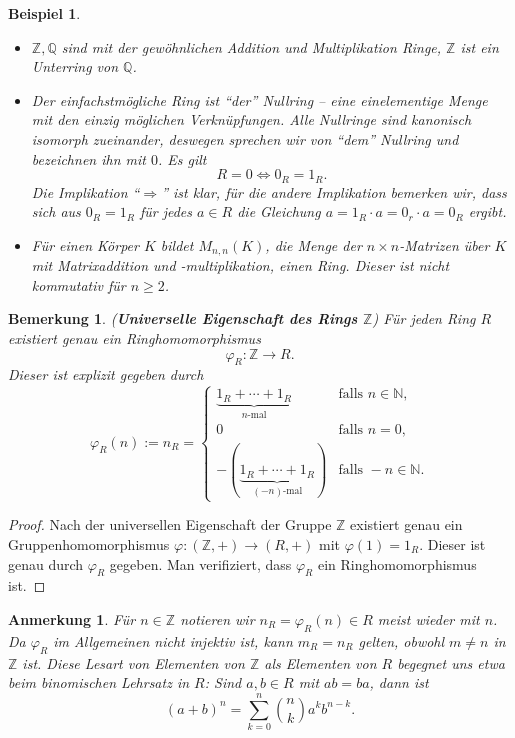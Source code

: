 \documentclass[a4paper, twoside, 11pt, ngerman]{report}
\newcommand{\NN}{\mathds N}
\newcommand{\QQ}{\mathds Q}
\newcommand{\ZZ}{\mathds Z}
\theoremstyle{definistyle}
\newtheorem{bem}[satz]{Bemerkung}
\newtheorem{anm}[satz]{Anmerkung}
\newtheorem{bsp}[satz]{Beispiel}
\theoremstyle{remark}
\newcommand{\defn}[1]{\textit{\bfseries #1}}
\begin{document}
\begin{bsp}\label{bsp:ring_beispiele}
\begin{itemize}
    \item[(a)] $\mathbb{Z},\QQ$ sind mit der gewöhnlichen Addition und Multiplikation Ringe,
    $\ZZ$ ist ein Unterring von $\QQ$.
    \item[(b)] Der einfachstmögliche Ring ist "`der"' Nullring -- eine einelementige Menge mit den einzig möglichen Verknüpfungen. Alle Nullringe sind kanonisch isomorph zueinander,
    deswegen sprechen wir von "`dem"' Nullring und bezeichnen ihn mit $0$.
    Es gilt
    \[
    R=0 \iff 0_R = 1_R.
    \]
    Die Implikation "`$\Rightarrow$"' ist klar, für die andere Implikation bemerken wir, dass
    sich aus $0_R=1_R$ für jedes $a\in R$ die Gleichung $a=1_R\cdot a=0_r\cdot a=0_R$
    ergibt.
    \item[(c)] Für einen Körper $K$ bildet $M_{n,n}(K)$, die Menge der $n \times n$-Matrizen über $K$ mit Matrixaddition und -multiplikation, einen Ring. Dieser ist nicht kommutativ für $n \geq 2$.
\end{itemize}
\end{bsp}

\begin{bem}\label{bem:universelle_eigenschaft_z_ring}
(\defn{Universelle Eigenschaft des Rings $\ZZ$}) Für jeden Ring $R$ existiert genau ein Ringhomomorphismus
\[
\varphi_R \colon \ZZ \to R.
\]
Dieser ist explizit gegeben durch
\[
\varphi_R(n) := n_R = \begin{cases} 
\underbrace{1_R + \cdots + 1_R}_{\text{$n$-mal}} & \text{falls } n \in \NN, \\ 
0 & \text{falls } n = 0, \\ 
-(\underbrace{1_R + \cdots + 1_R}_{\text{$(-n)$-mal}}) & \text{falls } -n \in \NN. 
\end{cases}
\]
\end{bem}

\begin{proof}
Nach der universellen Eigenschaft der Gruppe $\ZZ$ existiert genau ein Gruppenhomomorphismus $\varphi \colon (\ZZ, +) \to (R, +)$ mit $\varphi(1) = 1_R$. Dieser ist genau durch $\varphi_R$ gegeben. Man verifiziert, dass $\varphi_R$ ein Ringhomomorphismus ist.
\end{proof}

\begin{anm}
Für $n\in\ZZ$ notieren wir $n_R=\varphi_R(n)\in R$ meist wieder mit $n$. Da $\varphi_R$ im Allgemeinen nicht injektiv ist, kann $m_R=n_R$ gelten, obwohl $m\neq n$ in $\ZZ$ ist.
Diese Lesart von Elementen von $\ZZ$ als Elementen von $R$ begegnet uns etwa beim binomischen Lehrsatz in $R$: Sind $a,b\in R$ mit $ab=ba$, dann ist
\[
(a+b)^n=\sum_{k=0}^n\binom{n}{k}a^{k}b^{n-k}.
\]
\end{anm}
\end{document}
